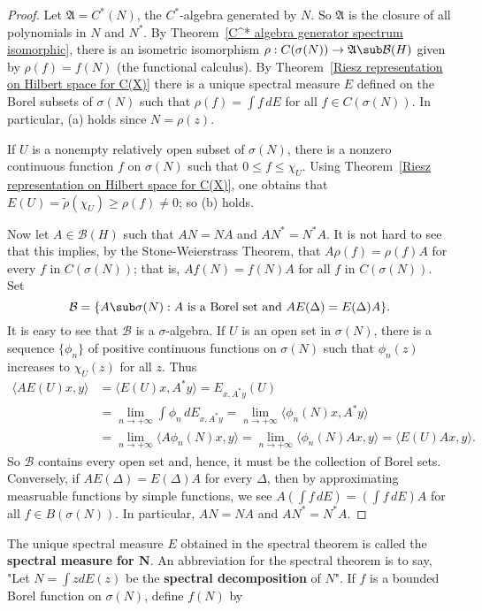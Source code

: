 \begin{proof}
Let $\mathfrak{A}=C^*(N)$, the $C^*$-algebra generated by $N$. So $\mathfrak{A}$ is the closure of all polynomials in $N$ and $N^*$. By Theorem~\ref{C^* algebra generator spectrum isomorphic}, there is an isometric isomorphism $\rho:C(\sigma(N))\to\mathfrak{A}\sub\mathcal{B}(H)$ given by $\rho(f)=f(N)$ (the functional calculus). By Theorem~\ref{Riesz representation on Hilbert space for C(X)} there is a unique spectral measure $E$ defined on the Borel subsets of $\sigma(N)$ such that $\rho(f)=\int f\,dE$ for all $f\in C(\sigma(N))$. In particular, (a) holds since $N=\rho(z)$.\par
If $U$ is a nonempty relatively open subset of $\sigma(N)$, there is a nonzero continuous function $f$ on $\sigma(N)$ such that $0\leq f\leq\chi_U$. Using Theorem~\ref{Riesz representation on Hilbert space for C(X)}, one obtains that $E(U)=\widetilde{\rho}(\chi_U)\geq\rho(f)\neq 0$; so (b) holds.\par
Now let $A\in\mathcal{B}(H)$ such that $AN=NA$ and $AN^*=N^*A$. It is not hard to see that this implies, by the Stone-Weierstrass Theorem, that $A\rho(f)=\rho(f)A$ for every $f$ in $C(\sigma(N))$; that is, $Af(N)=f(N)A$ for all $f$ in $C(\sigma(N))$. Set
\[\mathcal{B}=\{A\sub\sigma(N):\text{$A$ is a Borel set and $AE(\Delta)=E(\Delta)A$}\}.\]
It is easy to see that $\mathcal{B}$ is a $\sigma$-algebra. If $U$ is an open set in $\sigma(N)$, there is a sequence $\{\phi_n\}$ of positive continuous functions on $\sigma(N)$ such that $\phi_n(z)$ increases to $\chi_U(z)$ for all $z$. Thus
\begin{align*}
\langle AE(U)x,y\rangle&=\langle E(U)x,A^*y\rangle=E_{x,A^*y}(U)\\
&=\lim_{n\to+\infty}\int\phi_n\,dE_{x,A^*y}=\lim_{n\to+\infty}\langle\phi_n(N)x,A^*y\rangle\\
&=\lim_{n\to+\infty}\langle A\phi_n(N)x,y\rangle=\lim_{n\to+\infty}\langle\phi_n(N)Ax,y\rangle=\langle E(U)Ax,y\rangle.
\end{align*}
So $\mathcal{B}$ contains every open set and, hence, it must be the collection of Borel sets. Conversely, if $AE(\Delta)=E(\Delta)A$ for every $\Delta$, then by approximating measruable functions by simple functions, we see $A(\int f\,dE)=(\int f\,dE)A$ for all $f\in B(\sigma(N))$. In particular, $AN=NA$ and $AN^*=N^*A$.
\end{proof}
The unique spectral measure $E$ obtained in the spectral theorem is called the \textbf{spectral measure for $\bm{N}$}. An abbreviation for the spectral theorem is to say, "Let $N=\int zdE(z)$ be the \textbf{spectral decomposition} of $N$". If $f$ is a bounded Borel function on $\sigma(N)$, define $f(N)$ by
